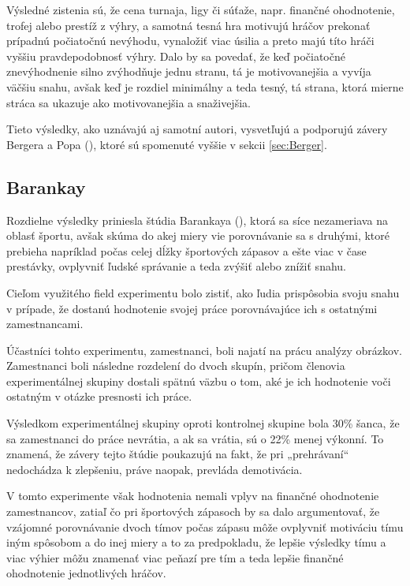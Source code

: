 \documentclass[
  digital, %
  oneside, %
  notable,   %
  lof,     %
  lot,     %
]{fithesis3}
\begin{document}
		Výsledné zistenia sú, že cena turnaja, ligy či súťaže, napr. finančné ohodnotenie, trofej alebo prestíž z výhry, a samotná tesná hra motivujú hráčov prekonať prípadnú počiatočnú nevýhodu, vynaložiť viac úsilia a preto majú títo hráči vyššiu pravdepodobnosť výhry. \parencite[s.~20]{bergerhoff2015} Dalo by sa povedať, že keď počiatočné znevýhodnenie silno zvýhodňuje jednu stranu, tá je motivovanejšia a vyvíja väčšiu snahu, avšak keď je rozdiel minimálny a teda tesný, tá strana, ktorá mierne stráca sa ukazuje ako motivovanejšia a snaživejšia.
		
		Tieto výsledky, ako uznávajú aj samotní autori, vysvetľujú a podporujú závery Bergera a Popa (\citeyear{berger2011}), ktoré sú spomenuté vyššie v sekcii \ref{sec:Berger}.
		
		\subsection{Barankay}
		Rozdielne výsledky priniesla štúdia Barankaya (\citeyear{barankay2010}), ktorá sa síce nezameriava na oblasť športu, avšak skúma do akej miery vie porovnávanie sa s druhými, ktoré prebieha napríklad počas celej dĺžky športových zápasov a ešte viac v čase prestávky, ovplyvniť ľudské správanie a teda zvýšiť alebo znížiť snahu.
		
		Cieľom využitého field experimentu bolo zistiť, ako ľudia prispôsobia svoju snahu v prípade, že dostanú hodnotenie svojej práce porovnávajúce ich s ostatnými zamestnancami. 
		
		Účastníci tohto experimentu, zamestnanci, boli najatí na prácu analýzy obrázkov. Zamestnanci boli následne rozdelení do dvoch skupín, pričom členovia experimentálnej skupiny dostali spätnú väzbu o tom, aké je ich hodnotenie voči ostatným v otázke presnosti ich práce. 
		
		Výsledkom experimentálnej skupiny oproti kontrolnej skupine bola 30\% šanca, že sa zamestnanci do práce nevrátia, a ak sa vrátia, sú o 22\% menej výkonní. To znamená, že závery tejto štúdie poukazujú na fakt, že pri „prehrávaní“ nedochádza k zlepšeniu, práve naopak, prevláda demotivácia. \parencite[s.~4]{barankay2010}
		
		V tomto experimente však hodnotenia nemali vplyv na finančné ohodnotenie zamestnancov, zatiaľ čo pri športových zápasoch by sa dalo argumentovať, že vzájomné porovnávanie dvoch tímov počas zápasu môže ovplyvniť motiváciu tímu iným spôsobom a do inej miery a to za predpokladu, že lepšie výsledky tímu a viac výhier môžu znamenať viac peňazí pre tím a teda lepšie finančné ohodnotenie jednotlivých hráčov.
		
\end{document}
